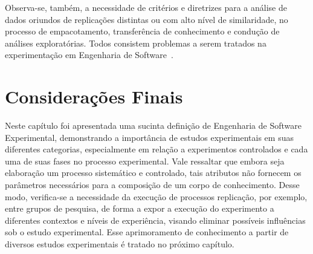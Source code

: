 Observa-se, também, a necessidade de critérios e diretrizes para a análise de dados oriundos de replicações distintas ou com alto nível de similaridade, no processo de empacotamento, transferência de conhecimento e condução de análises exploratórias. Todos consistem problemas a serem tratados na experimentação em Engenharia de Software~\cite{Garcia06}. 


\section{Considerações Finais}
Neste capítulo foi apresentada uma sucinta definição de Engenharia de Software Experimental, demonstrando a importância de estudos experimentais em suas diferentes categorias, especialmente em relação a experimentos controlados e cada uma de suas fases no processo experimental. Vale ressaltar que embora seja elaboração um processo sistemático e controlado, tais atributos não fornecem os parâmetros necessários para a composição de um corpo de conhecimento. 
Desse modo, verifica-se a necessidade da execução de processos replicação, por exemplo, entre grupos de pesquisa, de forma a expor a execução do experimento a diferentes contextos e níveis de experiência, visando eliminar possíveis influências sob o estudo experimental. Esse aprimoramento de conhecimento a partir de diversos estudos experimentais é tratado no próximo capítulo.


